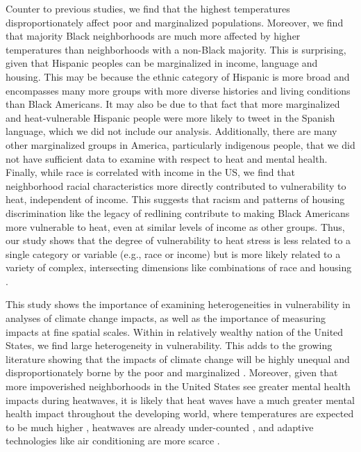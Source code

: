 \documentclass[fleqn,10pt]{wlscirep}
\begin{document}
Counter to previous studies, we find that the highest temperatures disproportionately affect poor and marginalized populations. Moreover, we find that majority Black neighborhoods are much more affected by higher temperatures than neighborhoods with a non-Black majority. This is surprising, given that Hispanic peoples can be marginalized in income, language and housing. This may be because the ethnic category of Hispanic is more broad and encompasses many more groups with more diverse histories and living conditions than Black Americans. It may also be due to that fact that more marginalized and heat-vulnerable Hispanic people were more likely to tweet in the Spanish language, which we did not include our analysis. Additionally, there are many other marginalized groups in America, particularly indigenous people, that we did not have sufficient data to examine with respect to heat and mental health. Finally, while race is correlated with income in the US, we find that neighborhood racial characteristics more directly contributed to vulnerability to heat, independent of income. This suggests that racism and patterns of housing discrimination like the legacy of redlining contribute to making Black Americans more vulnerable to heat, even at similar levels of income as other groups. Thus, our study shows that the degree of vulnerability to heat stress is less related to a single category or variable (e.g., race or income) but is more likely related to a variety of complex, intersecting dimensions like combinations of race and housing \cite{Kuran2020Nov}. 

This study shows the importance of examining heterogeneities in vulnerability in analyses of climate change impacts, as well as the importance of measuring impacts at fine spatial scales. Within in relatively wealthy nation of the United States, we find large heterogeneity in vulnerability. This adds to the growing literature showing that the impacts of climate change will be highly unequal and disproportionately borne by the poor and marginalized \cite{Thomas2019Mar}. Moreover, given that more impoverished neighborhoods in the United States see greater mental health impacts during heatwaves, it is likely that heat waves have a much greater mental health impact throughout the developing world, where temperatures are expected to be much higher \cite{Raymond2020May}, heatwaves are already under-counted \cite{Harrington2020Sep}, and adaptive technologies like air conditioning are more scarce \cite{Biardeau2020Jan}.
\end{document}
